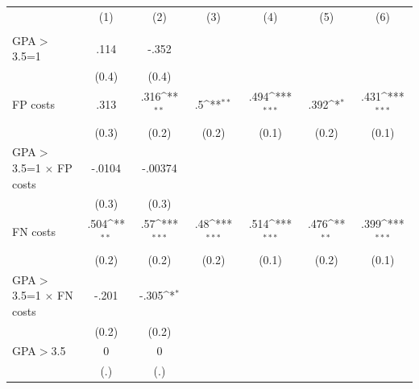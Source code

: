 {
\def\sym#1{\ifmmode^{#1}\else\(^{#1}\)\fi}
\begin{tabular}{l*{6}{c}}
\hline\hline
                &\multicolumn{1}{c}{(1)}&\multicolumn{1}{c}{(2)}&\multicolumn{1}{c}{(3)}&\multicolumn{1}{c}{(4)}&\multicolumn{1}{c}{(5)}&\multicolumn{1}{c}{(6)}\\
                &\multicolumn{1}{c}{}&\multicolumn{1}{c}{}&\multicolumn{1}{c}{}&\multicolumn{1}{c}{}&\multicolumn{1}{c}{}&\multicolumn{1}{c}{}\\
\hline
GPA$>$3.5=1     &     .114         &    -.352         &                  &                  &                  &                  \\
                &    (0.4)         &    (0.4)         &                  &                  &                  &                  \\
FP costs        &     .313         &     .316\sym{**} &       .5\sym{**} &     .494\sym{***}&     .392\sym{*}  &     .431\sym{***}\\
                &    (0.3)         &    (0.2)         &    (0.2)         &    (0.1)         &    (0.2)         &    (0.1)         \\
GPA$>$3.5=1 $\times$ FP costs&   -.0104         &  -.00374         &                  &                  &                  &                  \\
                &    (0.3)         &    (0.3)         &                  &                  &                  &                  \\
FN costs        &     .504\sym{**} &      .57\sym{***}&      .48\sym{***}&     .514\sym{***}&     .476\sym{**} &     .399\sym{***}\\
                &    (0.2)         &    (0.2)         &    (0.2)         &    (0.1)         &    (0.2)         &    (0.1)         \\
GPA$>$3.5=1 $\times$ FN costs&    -.201         &    -.305\sym{*}  &                  &                  &                  &                  \\
                &    (0.2)         &    (0.2)         &                  &                  &                  &                  \\
GPA$>$3.5       &        0         &        0         &                  &                  &                  &                  \\
                &      (.)         &      (.)         &                  &                  &                  &                  \\

\end{tabular}}
